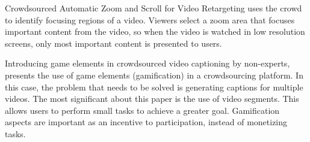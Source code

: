 Crowdsourced Automatic Zoom and Scroll for Video Retargeting \cite{carlier2010crowdsourced} uses the crowd to identify focusing regions of a video. Viewers select a zoom area that focuses important content from the video, so when the video is watched in low resolution screens, only most important content is presented to users.

Introducing game elements in crowdsourced video captioning by non-experts, \cite{kacorri2014introducing} presents the use of game elements (gamification) in a crowdsourcing platform. In this case, the problem that needs to be solved is generating captions for multiple videos. The most significant about this paper is the use of video segments. This allows users to perform small tasks to achieve a greater goal. Gamification aspects are important as an incentive to participation, instead of monetizing tasks.
